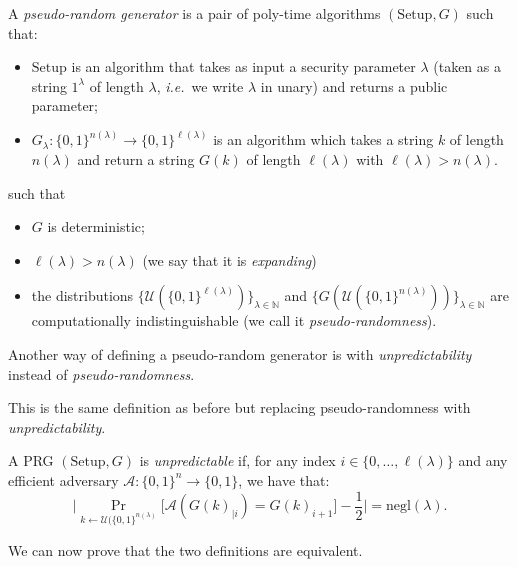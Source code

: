 \documentclass[./main]{subfiles}
\begin{document}
  \begin{defn}
    A \textit{pseudo-random generator} is a pair of poly-time algorithms $(\mathrm{Setup}, G)$ such that:
    \begin{itemize}
      \item $\mathrm{Setup}$ is an algorithm that takes as input a security parameter $\lambda$ (taken as a string $1^\lambda$ of length $\lambda$, \textit{i.e.}\ we write $\lambda$ in unary) and returns a public parameter;
      \item $G_\lambda : \{0,1\}^{n(\lambda)} \to \{0,1\}^{\ell(\lambda)}$ is an algorithm which takes a string $k$ of length $n(\lambda)$ and return a string $G(k)$ of length $\ell(\lambda)$ with $\ell(\lambda) > n(\lambda)$.
    \end{itemize}
    such that
    \begin{itemize}
      \item $G$ is deterministic;
      \item $\ell(\lambda) > n(\lambda)$ (we say that it is \textit{expanding})
      \item the distributions $\{\mathcal{U}(\{0,1\}^{\ell(\lambda)})\}_{\lambda \in \mathds{N}}$ and $\{G(\mathcal{U}(\{0,1\} ^{n(\lambda)}))\}_{\lambda \in \mathds{N}}$ are computationally indistinguishable (we call it \textit{pseudo-randomness}).
    \end{itemize}
  \end{defn}

  Another way of defining a pseudo-random generator is with \textit{unpredictability} instead of \textit{pseudo-randomness}.
  \begin{defn}
    This is the same definition as before but replacing pseudo-randomness with \textit{unpredictability}.

    A PRG $(\mathrm{Setup}, G)$ is \textit{unpredictable} if, for any index $i \in \{0, \ldots, \ell(\lambda)\}$ and any efficient adversary $\mathcal{A} : \{0,1\}^{n} \to \{0,1\}$, we have that:
    \[
    \Big|
    \Pr_{k \gets \mathcal{U}(\{0, 1\}^{n(\lambda)} } \big[\mathcal{A}(G(k)_{|i}) = G(k)_{i+1}\big] - \frac{1}{2}
    \Big| = \mathrm{negl}(\lambda)
    .\]
  \end{defn}

  We can now prove that the two definitions are equivalent.
\end{document}
